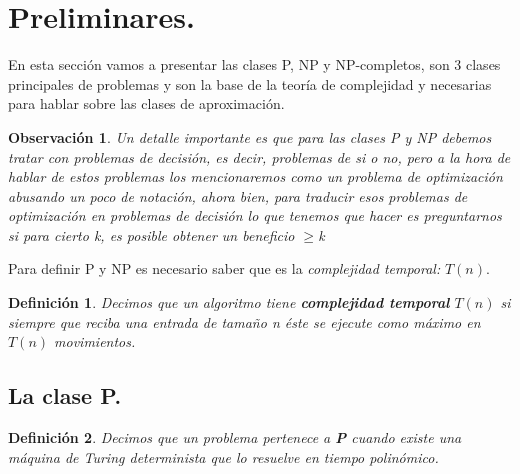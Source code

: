 \documentclass[a4paper,12pt,titlepage]{article}
\newtheorem{defi}{Definici\'on}[section]
\newtheorem{obs}{Observaci\'on}[section]
\begin{document}
\newpage

\section{Preliminares.}

En esta secci\'on vamos a presentar las clases P, NP y NP-completos, son 3
clases principales de problemas y son la base de la teor\'ia de complejidad
y necesarias para hablar sobre las clases de aproximaci\'on.

\begin{obs}

Un detalle importante es que para las clases P y NP debemos tratar con problemas de decisi\'on, es decir, problemas de si o no, pero a la hora de hablar de estos problemas los mencionaremos como un problema de optimizaci\'on abusando un poco de notaci\'on, ahora bien, para traducir esos problemas de optimizaci\'on en problemas de decisi\'on lo que tenemos que hacer es preguntarnos si para cierto k, es posible obtener un beneficio $\geq$k

\end{obs}

Para definir P y NP es necesario saber que es la \textsl{complejidad temporal:} $T(n)$.

\begin{defi}

Decimos que un algoritmo tiene \textbf{complejidad temporal}
$T(n)$ si siempre que reciba una entrada de tamaño n \'este se
ejecute como m\'aximo en $T(n)$ movimientos.

\end{defi}

\subsection{La clase P.}

\begin{defi}

Decimos que un problema pertenece a \textbf{P} cuando existe una m\'aquina de Turing determinista que lo resuelve en tiempo polin\'omico.

\end{defi}
\end{document}
